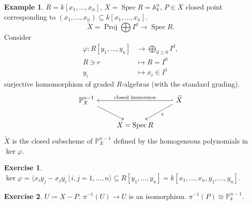 \documentclass[12pt]{article}
\DeclareMathOperator{\Spec}{Spec}
\DeclareMathOperator{\Proj}{Proj}
\theoremstyle{definition}
\newtheorem*{exercise}{Exercise}
\newtheorem*{example}{Example}
\begin{document}
\begin{example}
$R=k[x_1,\ldots,x_n]$, $X=\Spec R=\mathbb{A}_k^n$, $P\in X$ closed point corresponding to $(x_1,\ldots,x_n)\subseteq k[x_1,\ldots,x_n]$.
\[\widetilde{X}=\Proj\bigoplus I^d\longrightarrow\Spec R.\]
Consider
\begin{align*}
\varphi:R[y_1,\ldots,y_n]&\longrightarrow\bigoplus_{d\geq0}I^d,\\
R\ni r&\longmapsto R=I^0\\
y_i&\longmapsto x_i\in I^1
\end{align*}
surjective homomorphism of graded $R$-algebras (with the standard grading).
\[
\begin{tikzcd}
\mathbb{P}_X^{n-1}\arrow[rd]&&\widetilde{X}\arrow[ll,hook',"\text{closed immersion}",swap]\arrow[ld,"\pi"]\\
&X=\Spec R
\end{tikzcd}
\]
$\widetilde{X}$ is the closed subscheme of $\mathbb{P}_X^{n-1}$ defined by the homogeneous polynomials in $\ker\varphi$.

\begin{exercise}
$\ker\varphi=\langle x_iy_j-x_jy_i\,|\,i,j=1,\ldots,n\rangle\subseteq R[y_1,\ldots,y_n]=k[x_1,\ldots,x_n,y_1,\ldots,y_n]$.
\end{exercise}

\begin{exercise}
$U\coloneqq X-P$. $\pi^{-1}(U)\rightarrow U$ is an isomorphism. $\pi^{-1}(P)\cong\mathbb{P}_k^{n-1}$.
\end{exercise}
\end{example}
\end{document}

